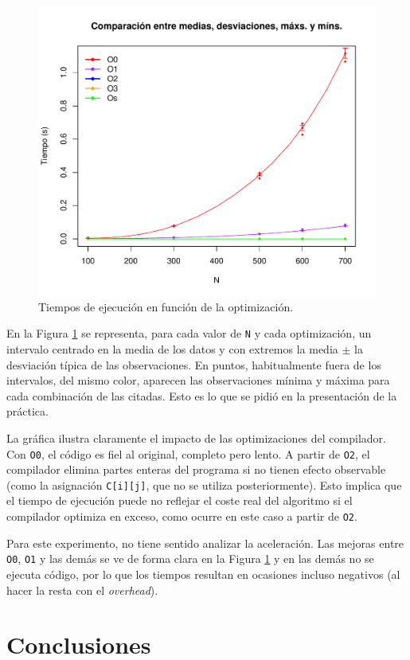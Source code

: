 \documentclass[11pt,a4paper,twoside]{article}
\theoremstyle{definition}
\begin{document}
	\begin{figure} [H] \centering
		\includegraphics[width=.8\textwidth]{../graficas/tiempos.pdf}
		\caption{Tiempos de ejecución en función de la optimización.}
		\label{tiempos}
	\end{figure}

	En la Figura \ref{tiempos} se representa, para cada valor de \texttt{N} y cada optimización, un intervalo centrado en la media de los datos y con extremos la media $\pm$ la desviación típica de las observaciones. En puntos, habitualmente fuera de los intervalos, del mismo color, aparecen las observaciones mínima y máxima para cada combinación de las citadas. Esto es lo que se pidió en la presentación de la práctica.
	
	La gráfica ilustra claramente el impacto de las optimizaciones del compilador. Con \texttt{O0}, el código es fiel al original, completo pero lento. A partir de \texttt{O2}, el compilador elimina partes enteras del programa si no tienen efecto observable (como la asignación \texttt{C[i][j]}, que no se utiliza posteriormente). Esto implica que el tiempo de ejecución puede no reflejar el coste real del algoritmo si el compilador optimiza en exceso, como ocurre en este caso a partir de \texttt{O2}.
	
	Para este experimento, no tiene sentido analizar la aceleración. Las mejoras entre \texttt{O0}, \texttt{O1} y las demás se ve de forma clara en la Figura \ref{tiempos} y en las demás no se ejecuta código, por lo que los tiempos resultan en ocasiones incluso negativos (al hacer la resta con el \textit{overhead}).
	
	
	\section{Conclusiones}


\printbibliography
	
	
\end{document}
